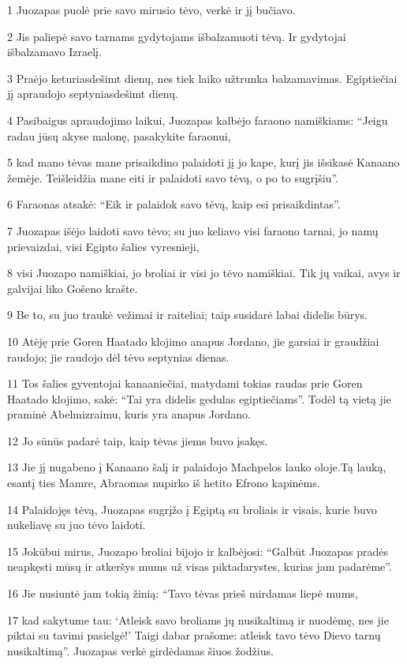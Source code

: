 \par 1 Juozapas puolė prie savo mirusio tėvo, verkė ir jį bučiavo. 
\par 2 Jis paliepė savo tarnams gydytojams išbalzamuoti tėvą. Ir gydytojai išbalzamavo Izraelį. 
\par 3 Praėjo keturiasdešimt dienų, nes tiek laiko užtrunka balzamavimas. Egiptiečiai jį apraudojo septyniasdešimt dienų. 
\par 4 Pasibaigus apraudojimo laikui, Juozapas kalbėjo faraono namiškiams: “Jeigu radau jūsų akyse malonę, pasakykite faraonui, 
\par 5 kad mano tėvas mane prisaikdino palaidoti jį jo kape, kurį jis išsikasė Kanaano žemėje. Teišleidžia mane eiti ir palaidoti savo tėvą, o po to sugrįšiu”. 
\par 6 Faraonas atsakė: “Eik ir palaidok savo tėvą, kaip esi prisaikdintas”. 
\par 7 Juozapas išėjo laidoti savo tėvo; su juo keliavo visi faraono tarnai, jo namų prievaizdai, visi Egipto šalies vyresnieji, 
\par 8 visi Juozapo namiškiai, jo broliai ir visi jo tėvo namiškiai. Tik jų vaikai, avys ir galvijai liko Gošeno krašte. 
\par 9 Be to, su juo traukė vežimai ir raiteliai; taip susidarė labai didelis būrys. 
\par 10 Atėję prie Goren Haatado klojimo anapus Jordano, jie garsiai ir graudžiai raudojo; jie raudojo dėl tėvo septynias dienas. 
\par 11 Tos šalies gyventojai kanaaniečiai, matydami tokias raudas prie Goren Haatado klojimo, sakė: “Tai yra didelis gedulas egiptiečiams”. Todėl tą vietą jie praminė Abelmizraimu, kuris yra anapus Jordano. 
\par 12 Jo sūnūs padarė taip, kaip tėvas jiems buvo įsakęs. 
\par 13 Jie jį nugabeno į Kanaano šalį ir palaidojo Machpelos lauko oloje.Tą lauką, esantį ties Mamre, Abraomas nupirko iš hetito Efrono kapinėms. 
\par 14 Palaidojęs tėvą, Juozapas sugrįžo į Egiptą su broliais ir visais, kurie buvo nukeliavę su juo tėvo laidoti. 
\par 15 Jokūbui mirus, Juozapo broliai bijojo ir kalbėjosi: “Galbūt Juozapas pradės neapkęsti mūsų ir atkeršys mums už visas piktadarystes, kurias jam padarėme”. 
\par 16 Jie nusiuntė jam tokią žinią: “Tavo tėvas prieš mirdamas liepė mums, 
\par 17 kad sakytume tau: ‘Atleisk savo broliams jų nusikaltimą ir nuodėmę, nes jie piktai su tavimi pasielgė!’ Taigi dabar prašome: atleisk tavo tėvo Dievo tarnų nusikaltimą”. Juozapas verkė girdėdamas šiuos žodžius. 
